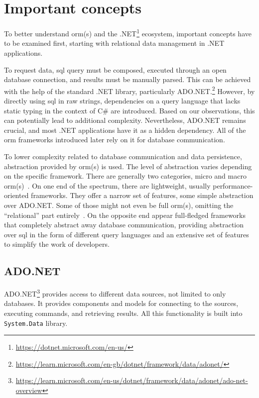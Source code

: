 \section{Important concepts}
To better understand \acrshort{orm}(s) and the .NET\footnote{\url{https://dotnet.microsoft.com/en-us/}} ecosystem, important concepts have to be examined first, starting with relational data management in .NET applications. 

To request data, \acrshort{sql} query must be composed, executed through an open database connection, and results must be manually parsed. This can be achieved with the help of the standard .NET library, particularly ADO.NET.\footnote{\url{https://learn.microsoft.com/en-gb/dotnet/framework/data/adonet/}} However, by directly using \acrshort{sql} in raw strings, dependencies on a query language that lacks static typing in the context of C\# are introduced. Based on our observations, this can potentially lead to additional complexity. Nevertheless, ADO.NET remains crucial, and most .NET applications have it as a hidden dependency. All of the \acrshort{orm} frameworks introduced later rely on it for database communication. 

To lower complexity related to database communication and data persistence, abstraction provided by \acrshort{orm}(s) is used. The level of abstraction varies depending on the specific framework. There are generally two categories, micro and macro \acrshort{orm}(s)~\cite{shapovalov2024micro}. On one end of the spectrum, there are lightweight, usually performance-oriented frameworks. They offer a narrow set of features, some simple abstraction over ADO.NET. Some of those might not even be full \acrshort{orm}(s), omitting the ``relational'' part entirely~\cite{Dapper}. On the opposite end appear full-fledged frameworks that completely abstract away database communication, providing abstraction over \acrshort{sql} in the form of different query languages and an extensive set of features to simplify the work of developers.

\subsection{ADO.NET}
ADO.NET\footnote{\url{https://learn.microsoft.com/en-us/dotnet/framework/data/adonet/ado-net-overview}} provides access to different data sources, not limited to only databases. It provides components and models for connecting to the sources, executing commands, and retrieving results. All this functionality is built into \texttt{System.Data} library.

